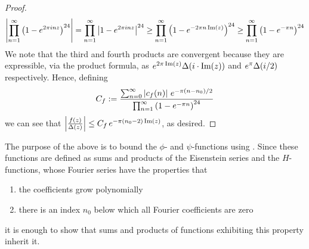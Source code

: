\begin{proof}
    \begin{align*}
        \left\lvert \prod_{n=1}^{\infty} \left( 1 - e^{2 \pi i n z} \right)^{24} \right\rvert
        = \prod_{n=1}^{\infty} \left\lvert 1 - e^{2 \pi i n z} \right\rvert^{24}
        \geq \prod_{n=1}^{\infty} \left( 1 - e^{-2 \pi n \operatorname{Im}(z)} \right)^{24}
        \geq \prod_{n=1}^{\infty}\left( 1 - e^{-\pi n} \right)^{24}
    \end{align*}
    We note that the third and fourth products are convergent because they are expressible, via the product formula, as $e^{2\pi\operatorname{Im}(z)} \Delta\!\left( i \cdot \operatorname{Im}(z) \right)$ and $e^{\pi} \Delta\!\left( i/2 \right)$ respectively. Hence, defining
    \begin{align*}
        C_f := \frac{\sum_{n=0}^{\infty} \left\lvert c_f(n) \right\rvert \, e^{-\pi \left( n - n_0 \right)/2}}{\prod_{n=1}^{\infty}\left( 1 - e^{-\pi n} \right)^{24}}
    \end{align*}
    we can see that $\left\lvert \frac{f(z)}{\Delta(z)} \right\rvert \leq C_f \, e^{-\pi \left( n_0 - 2 \right) \operatorname{Im}(z)}$, as desired.
\end{proof}

The purpose of the above is to bound the $\phi$- and $\psi$-functions using . Since these functions are defined as sums and products of the Eisenstein series and the $H$-functions, whose Fourier series have the properties that
\begin{enumerate}
    \item the coefficients grow polynomially
    \item there is an index $n_0$ below which all Fourier coefficients are zero
\end{enumerate}
it is enough to show that sums and products of functions exhibiting this property inherit it.

